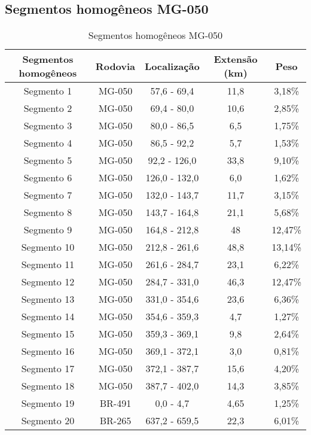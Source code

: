 \documentclass[
	12pt,				%
	openright,			%
	twoside,			%
	a4paper,			%
	english,			%
	french,				%
	spanish,			%
	brazil				%
	]{abntex2}
\begin{document}
\begin{apendicesenv}

\partapendices

\chapter{Segmentos homogêneos MG-050}
\label{chap:segmentos-homogeneos-mg050}


\begin{table}[h]
\ABNTEXfontereduzida\caption{Segmentos homogêneos MG-050}
\label{tab:segmentos-homogeneos-mg050}
\begin{tabular}{c c c c c}

\toprule

Segmentos homogêneos &  Rodovia & Localização & Extensão (km) & Peso \\
\midrule
Segmento 1 & MG-050 & 57,6 - 69,4 & 11,8 & 3,18\% \\
Segmento 2 & MG-050 & 69,4 - 80,0 & 10,6 & 2,85\% \\
Segmento 3 & MG-050 & 80,0 - 86,5 & 6,5 & 1,75\% \\
Segmento 4 & MG-050 & 86,5 - 92,2 & 5,7 & 1,53\% \\
Segmento 5 & MG-050 & 92,2 - 126,0 & 33,8 & 9,10\% \\
Segmento 6 & MG-050 & 126,0 - 132,0 & 6,0 & 1,62\% \\
Segmento 7 & MG-050 & 132,0 - 143,7 & 11,7 & 3,15\% \\
Segmento 8 & MG-050 & 143,7 - 164,8 & 21,1 & 5,68\% \\
Segmento 9 & MG-050 & 164,8 - 212,8 & 48 & 12,47\% \\
Segmento 10 & MG-050 & 212,8 - 261,6 & 48,8 & 13,14\% \\
Segmento 11 & MG-050 & 261,6 - 284,7 & 23,1 & 6,22\% \\
Segmento 12 & MG-050 & 284,7 - 331,0 & 46,3 & 12,47\% \\
Segmento 13 & MG-050 & 331,0 - 354,6 & 23,6 & 6,36\% \\
Segmento 14 & MG-050 & 354,6 - 359,3 & 4,7 & 1,27\% \\
Segmento 15 & MG-050 & 359,3 - 369,1 & 9,8 & 2,64\% \\
Segmento 16 & MG-050 & 369,1 - 372,1 & 3,0 & 0,81\% \\
Segmento 17 & MG-050 & 372,1 - 387,7  & 15,6 & 4,20\% \\
Segmento 18 & MG-050 & 387,7 - 402,0 & 14,3 & 3,85\% \\
Segmento 19 & BR-491 & 0,0 - 4,7 & 4,65 & 1,25\% \\
Segmento 20 & BR-265 & 637,2 - 659,5 & 22,3 & 6,01\% \\


\end{tabular}
\end{table}
\end{apendicesenv}
\end{document}
